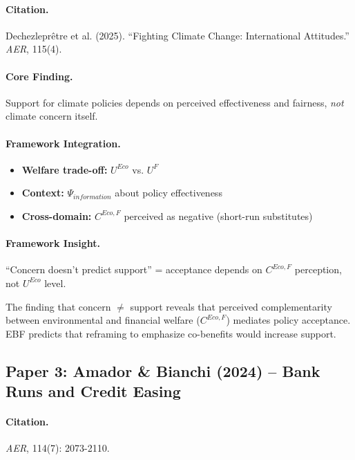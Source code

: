 \paragraph{Citation.}
Dechezleprêtre et al. (2025). ``Fighting Climate Change: International Attitudes.''
\emph{AER}, 115(4).

\paragraph{Core Finding.}
Support for climate policies depends on perceived effectiveness and fairness,
\emph{not} climate concern itself.

\paragraph{Framework Integration.}
\begin{itemize}
  \item \textbf{Welfare trade-off:} $U^{Eco}$ vs. $U^F$
  \item \textbf{Context:} $\Psi_{information}$ about policy effectiveness
  \item \textbf{Cross-domain:} $C^{Eco,F}$ perceived as negative (short-run substitutes)
\end{itemize}

\paragraph{Framework Insight.}
``Concern doesn't predict support'' = acceptance depends on $C^{Eco,F}$ perception,
not $U^{Eco}$ level.

\begin{tcolorbox}[colback=yellow!5!white, colframe=yellow!75!black,
    title=EBF Insight: Climate Policy]
The finding that concern $\neq$ support reveals that perceived complementarity
between environmental and financial welfare ($C^{Eco,F}$) mediates policy
acceptance. EBF predicts that reframing to emphasize co-benefits would increase
support.
\end{tcolorbox}


\subsection{Paper 3: Amador \& Bianchi (2024) -- Bank Runs and Credit Easing}

\paragraph{Citation.}
\emph{AER}, 114(7): 2073-2110.

